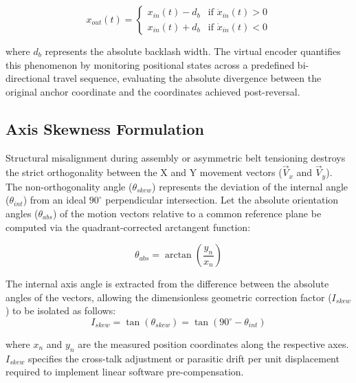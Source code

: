 \begin{equation}
x_{out}(t) = 
\begin{cases} 
x_{in}(t) - d_b & \text{if } \dot{x}_{in}(t) > 0 \\
x_{in}(t) + d_b & \text{if } \dot{x}_{in}(t) < 0 
\end{cases}
\end{equation}

where $d_b$ represents the absolute backlash width. The virtual encoder quantifies this phenomenon by monitoring positional states across a predefined bi-directional travel sequence, evaluating the absolute divergence between the original anchor coordinate and the coordinates achieved post-reversal.

\subsection{Axis Skewness Formulation}
Structural misalignment during assembly or asymmetric belt tensioning destroys the strict orthogonality between the X and Y movement vectors ($\vec{V}_x$ and $\vec{V}_y$). The non-orthogonality angle ($\theta_{skew}$) represents the deviation of the internal angle ($\theta_{int}$) from an ideal $90^\circ$ perpendicular intersection. Let the absolute orientation angles ($\theta_{abs}$) of the motion vectors relative to a common reference plane be computed via the quadrant-corrected arctangent function:

\begin{equation}
\theta_{abs} = \arctan\left(\frac{y_n}{x_n}\right)
\end{equation}

The internal axis angle is extracted from the difference between the absolute angles of the vectors, allowing the dimensionless geometric correction factor ($I_{skew}$) to be isolated as follows:
\begin{equation}
I_{skew} = \tan(\theta_{skew}) = \tan(90^{\circ} - \theta_{int})
\end{equation}

where $x_n$ and $y_n$ are the measured position coordinates along the respective axes. $I_{skew}$ specifies the cross-talk adjustment or parasitic drift per unit displacement required to implement linear software pre-compensation.